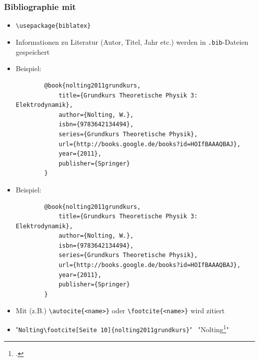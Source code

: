 \section{}

\begin{frame}[<+->][fragile]
	\frametitle{Bibliographie mit }
	
	\lstset{frame=L, numbers=left}
	\begin{itemize}
		\item \lstinline!\usepackage{biblatex}!
		\item Informationen zu Literatur (Autor, Titel, Jahr etc.) werden in \texttt{.bib}-Dateien gespeichert
		\item Beispiel:
		\begin{lstlisting}
		@book{nolting2011grundkurs,
		    title={Grundkurs Theoretische Physik 3: Elektrodynamik},
		    author={Nolting, W.},
		    isbn={9783642134494},
		    series={Grundkurs Theoretische Physik},
		    url={http://books.google.de/books?id=HOIfBAAAQBAJ},
		    year={2011},
		    publisher={Springer}
		}
		\end{lstlisting}
	\end{itemize}
\end{frame}

\begin{frame}[<+->][fragile]
	\lstset{frame=L, numbers=left}
	\begin{itemize}
		\item Beispiel:
		\begin{lstlisting}
		@book{nolting2011grundkurs,
		    title={Grundkurs Theoretische Physik 3: Elektrodynamik},
		    author={Nolting, W.},
		    isbn={9783642134494},
		    series={Grundkurs Theoretische Physik},
		    url={http://books.google.de/books?id=HOIfBAAAQBAJ},
		    year={2011},
		    publisher={Springer}
		}
		\end{lstlisting}
		\item Mit (z.B.) \lstinline!\autocite{<name>}! oder \lstinline!\footcite{<name>}! wird zitiert
		\item "\lstinline!Nolting\footcite[Seite 10]{nolting2011grundkurs}!" \textrightarrow\ "Nolting\footcite[Seite 10]{nolting2011grundkurs}"
	\end{itemize}
\end{frame}

